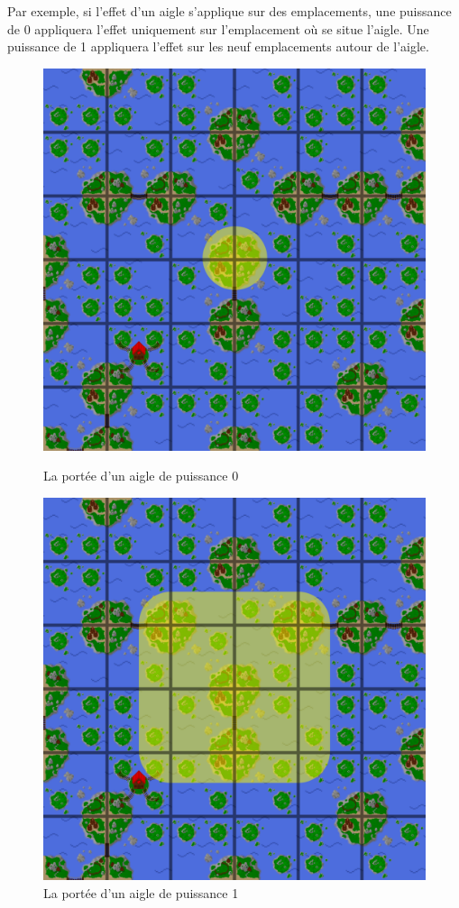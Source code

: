 Par exemple, si l'effet d'un aigle s'applique sur des emplacements,
une puissance de 0 appliquera l'effet uniquement sur l'emplacement où se
situe l'aigle.
Une puissance de 1 appliquera l'effet sur les neuf emplacements autour de
l'aigle.

\begin{figure}[h]
    \centering
    \begin{minipage}{.4\textwidth}
        \centering
        \includegraphics[width=.7\textwidth]{img/sprites/emplacement0.png}
        \caption*{La portée d'un aigle de puissance 0}
    \end{minipage}
    \begin{minipage}{.4\textwidth}
        \centering
        \includegraphics[width=.7\textwidth]{img/sprites/emplacement1.png}
        \caption*{La portée d'un aigle de puissance 1}
    \end{minipage}
\end{figure}


